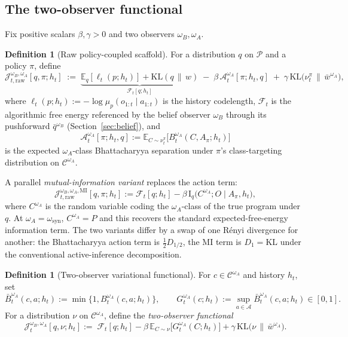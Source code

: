 \documentclass[11pt]{article}
\theoremstyle{definition}
\newtheorem{definition}[theorem]{Definition}
\theoremstyle{remark}
\theoremstyle{plain}
\theoremstyle{definition}
\newcommand{\Acal}{\mathcal{A}}
\newcommand{\Ccal}{\mathcal{C}}
\newcommand{\Pcal}{\mathcal{P}}
\newcommand{\E}{\mathbb{E}}
\newcommand{\KL}{\mathrm{KL}}
\newcommand{\I}{\mathrm{I}}
\newcommand{\givena}{\,\|\,}
\newcommand{\ellp}{\ell}
\begin{document}
\subsection{The two-observer functional}
\label{sec:two-observer-functional}

Fix positive scalars $\beta,\gamma>0$ and two observers $\omega_B,\omega_A$.

\begin{definition}[Raw policy-coupled scaffold]
\label{def:raw-two-observer-functional}
For a distribution $q$ on $\Pcal$ and a policy $\pi$, define
\[
\mathcal J_{t,\mathrm{raw}}^{\omega_B,\omega_A}[q,\pi;h_t]
\;:=\;
\underbrace{\E_q[\ellp_t(p;h_t)]+\KL(q\givena w)}_{\mathcal F_t[q;h_t]}
\;-\;\beta\,\mathcal A_t^{\omega_A}[\pi;h_t,q]
\;+\;\gamma\,\KL\!\bigl(\nu_t^\pi\,\|\,\bar w^{\omega_A}\bigr),
\]
where $\ellp_t(p;h_t):=-\log\mu_p(o_{1:t}\mid a_{1:t})$ is the history codelength, $\mathcal F_t$ is the algorithmic free energy referenced by the belief observer $\omega_B$ through its pushforward $\bar q^{\omega_B}$ (Section~\ref{sec:belief}), and
\[
\mathcal A_t^{\omega_A}[\pi;h_t,q]:=\E_{C\sim\nu_t^\pi}\bigl[B_t^{\omega_A}(C,A_\pi;h_t)\bigr]
\]
is the expected $\omega_A$-class Bhattacharyya separation under $\pi$'s class-targeting distribution on $\Ccal^{\omega_A}$.
\end{definition}

A parallel \emph{mutual-information variant} replaces the action term:
\[
\mathcal J_{t,\mathrm{raw}}^{\omega_B,\omega_A,\mathrm{MI}}[q,\pi;h_t]
:=\mathcal F_t[q;h_t]-\beta\,\I_q\!\bigl(C^{\omega_A};O\mid A_\pi,h_t\bigr),
\]
where $C^{\omega_A}$ is the random variable coding the $\omega_A$-class of the true program under $q$. At $\omega_A=\omega_{\mathrm{syn}}$, $C^{\omega_A}=P$ and this recovers the standard expected-free-energy information term. The two variants differ by a swap of one R\'enyi divergence for another: the Bhattacharyya action term is $\tfrac{1}{2}D_{1/2}$, the MI term is $D_1=\KL$ under the conventional active-inference decomposition.

\begin{definition}[Two-observer variational functional]
\label{def:two-observer-functional}
For $c\in\Ccal^{\omega_A}$ and history $h_t$, set
\[
\bar B_t^{\omega_A}(c,a;h_t):=\min\!\bigl\{1,B_t^{\omega_A}(c,a;h_t)\bigr\},
\qquad
G_t^{\omega_A}(c;h_t):=\sup_{a\in\Acal}\bar B_t^{\omega_A}(c,a;h_t)\in[0,1].
\]
For a distribution $\nu$ on $\Ccal^{\omega_A}$, define the \emph{two-observer functional}
\[
\boxed{\;
\mathcal J_t^{\omega_B,\omega_A}[q,\nu;h_t]
:=\;
\mathcal F_t[q;h_t]
-\beta\,\E_{C\sim\nu}\!\bigl[G_t^{\omega_A}(C;h_t)\bigr]
+\gamma\,\KL\!\bigl(\nu\,\|\,\bar w^{\omega_A}\bigr).
\;}
\]
\end{definition}
\end{document}
